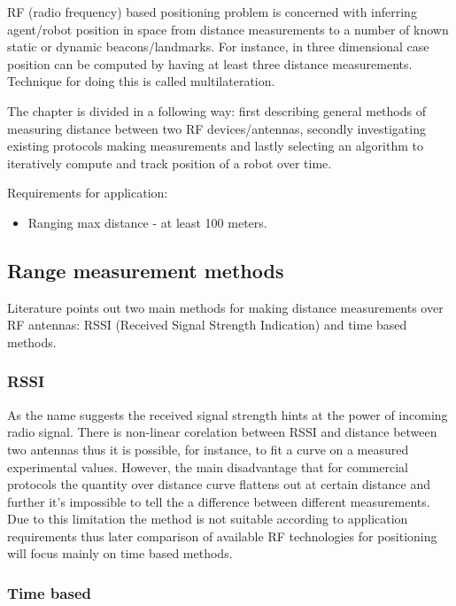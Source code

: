 
RF (radio frequency) based positioning problem is concerned with inferring agent/robot position in space from distance measurements to a number of known static or dynamic beacons/landmarks. For instance, in three dimensional case position can be computed by having at least three distance measurements. Technique for doing this is called multilateration.

The chapter is divided in a following way: first describing general methods of measuring distance between two RF devices/antennas, secondly investigating existing protocols making measurements and lastly selecting an algorithm to iteratively compute and track position of a robot over time.

Requirements for application:
\begin{itemize}
    \item Ranging max distance - at least 100 meters.
\end{itemize}

\subsection{Range measurement methods}

Literature points out two main methods for making distance measurements over RF antennas: RSSI (Received Signal Strength Indication) and time based methods.

\subsubsection{RSSI}

As the name suggests the received signal strength hints at the power of incoming radio signal. There is non-linear corelation between RSSI and distance between two antennas thus it is possible, for instance, to fit a curve on a measured experimental values. However, the main disadvantage that for commercial protocols the quantity over distance curve flattens out at certain distance and further it's impossible to tell the a difference between different measurements. Due to this limitation the method is not suitable according to application requirements thus later comparison of available RF technologies for positioning will focus mainly on time based methods.

\subsubsection{Time based}

